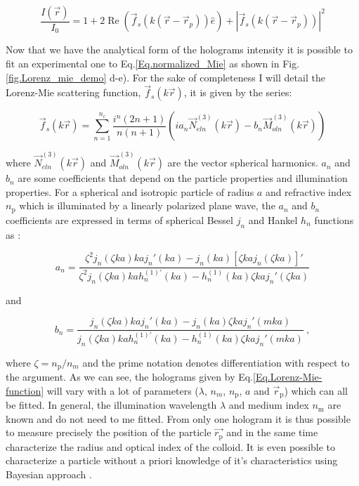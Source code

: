 \begin{equation}
	\frac{I(\vec{r})}{I_0} = 1 + 2 \operatorname{Re} 
	\left(  
		\vec{f}_s(k(\vec{r}- \vec{r}_p)) \hat{e}
	\right)
	+
	|
		\vec{f}_s(k(\vec{r}- \vec{r}_p))
	|^2
	\label{Eq.normalized_Mie}	
\end{equation}


Now that we have the analytical form of the holograms intensity it is possible to fit an experimental one to Eq.\ref{Eq.normalized_Mie} as shown in Fig.\ref{fig.Lorenz_mie_demo} d-e). For the sake of completeness I will detail the Lorenz-Mie scattering function, $\vec{f}_s(k\vec{r})$, it is given by the series:

\begin{equation}
	\vec{f}_s(k \vec{r}) = \sum _{n=1} ^{n_c} 
	\frac
	{
		i^n (2n +1)
	}
	{
		n(n+1)
	}
	\left(
		i a_n \vec{N}^{(3)}_{eln}(k\vec{r})
		-
		b_n \vec{M}^{(3)}_{oln}(k\vec{r})
	\right)
	\label{Eq.Lorenz-Mie-function}
\end{equation} 


where $\vec{N}^{(3)}_{eln}(k\vec{r})$ and $\vec{M}^{(3)}_{oln}(k\vec{r})$ are the vector spherical harmonics. $a_n$ and $b_n$ are some coefficients that depend on the particle properties and illumination properties. For a spherical and isotropic particle of radius $a$ and refractive index $n_\mathrm{p}$ which is illuminated by a linearly polarized plane wave, the $a_n$ and $b_n$ coefficients are expressed in terms of spherical Bessel $j_n$ and Hankel $h_n$ functions as \cite{f_bohren_absorption_1998}:

\begin{equation}
	a_n = 
	\frac
	{
		\zeta^2 j_n (\zeta k a)k a j_n' (k a) - j_n(ka)[\zeta kaj_n(\zeta ka)]'
	}
	{
		\zeta^2 j_n (\zeta k a)k a h_n^{(1)'} (k a) - h_n^{(1)}(ka)\zeta kaj_n'(\zeta ka)
	}
\end{equation}

and

\begin{equation}
	b_n =
	\frac
	{
		j_n(\zeta k a) kaj_n'(ka) - j_n (ka) \zeta kaj_n'(mka)
	}
	{
		j_n(\zeta k a) kah_n^{(1)'}(ka) - h_n^{(1)} (ka) \zeta kaj_n '(mka)
	} ~,
\end{equation}


	where $\zeta = n_\mathrm{p} / n_m$ and the prime notation denotes differentiation with respect to the argument. As we can see, the holograms given by Eq.\ref{Eq.Lorenz-Mie-function} will vary with a lot of parameters ($\lambda$, $n_m$, $n_\mathrm{p}$, $a$ and $\vec{r}_\mathrm{p}$) which can all be fitted. In general, the illumination wavelength $\lambda$ and medium index $n_\mathrm{m}$ are known and do not need to me fitted. From only one hologram it is thus possible to measure precisely the position of the particle $\vec{r_\mathrm{p}}$ and in the same time characterize the radius and optical index of the colloid. It is even possible to characterize a particle without a priori knowledge of it's characteristics using Bayesian approach \cite{gregory_bayesian_2005, dimiduk_bayesian_2016}.

